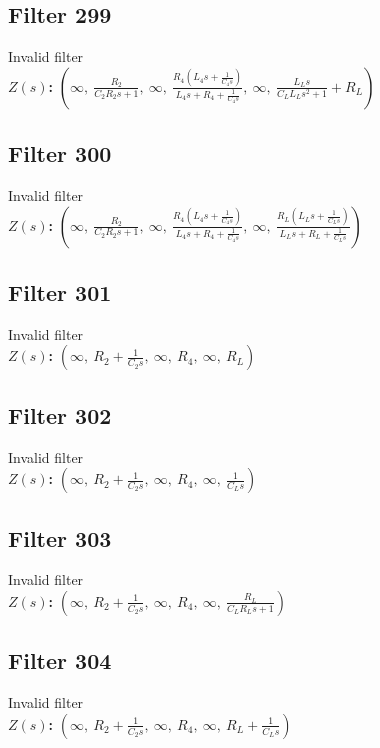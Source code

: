 \documentclass{article}
\begin{document}
\subsection*{Filter 299}
Invalid filter \\ 
\textbf{$Z(s)$:} $\left( \infty, \  \frac{R_{2}}{C_{2} R_{2} s + 1}, \  \infty, \  \frac{R_{4} \left(L_{4} s + \frac{1}{C_{4} s}\right)}{L_{4} s + R_{4} + \frac{1}{C_{4} s}}, \  \infty, \  \frac{L_{L} s}{C_{L} L_{L} s^{2} + 1} + R_{L}\right)$ \\ 
\subsection*{Filter 300}
Invalid filter \\ 
\textbf{$Z(s)$:} $\left( \infty, \  \frac{R_{2}}{C_{2} R_{2} s + 1}, \  \infty, \  \frac{R_{4} \left(L_{4} s + \frac{1}{C_{4} s}\right)}{L_{4} s + R_{4} + \frac{1}{C_{4} s}}, \  \infty, \  \frac{R_{L} \left(L_{L} s + \frac{1}{C_{L} s}\right)}{L_{L} s + R_{L} + \frac{1}{C_{L} s}}\right)$ \\ 
\subsection*{Filter 301}
Invalid filter \\ 
\textbf{$Z(s)$:} $\left( \infty, \  R_{2} + \frac{1}{C_{2} s}, \  \infty, \  R_{4}, \  \infty, \  R_{L}\right)$ \\ 
\subsection*{Filter 302}
Invalid filter \\ 
\textbf{$Z(s)$:} $\left( \infty, \  R_{2} + \frac{1}{C_{2} s}, \  \infty, \  R_{4}, \  \infty, \  \frac{1}{C_{L} s}\right)$ \\ 
\subsection*{Filter 303}
Invalid filter \\ 
\textbf{$Z(s)$:} $\left( \infty, \  R_{2} + \frac{1}{C_{2} s}, \  \infty, \  R_{4}, \  \infty, \  \frac{R_{L}}{C_{L} R_{L} s + 1}\right)$ \\ 
\subsection*{Filter 304}
Invalid filter \\ 
\textbf{$Z(s)$:} $\left( \infty, \  R_{2} + \frac{1}{C_{2} s}, \  \infty, \  R_{4}, \  \infty, \  R_{L} + \frac{1}{C_{L} s}\right)$ \\ 
\end{document}
